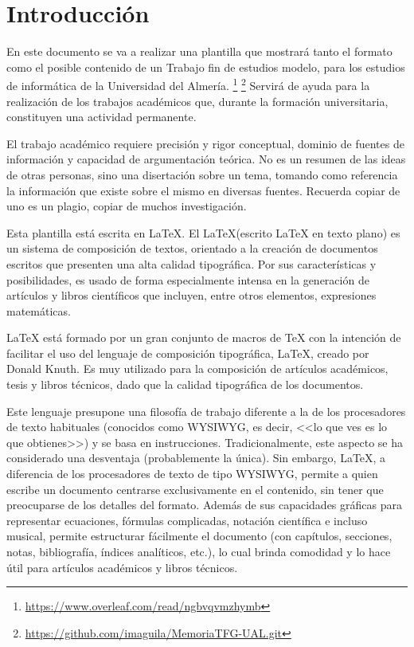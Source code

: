 \chapter {Introducción}
\label{sec:intro}


En este documento se va a realizar una plantilla que mostrará tanto el formato como el posible contenido de un Trabajo fin de estudios modelo, para los estudios de informática de la Universidad del Almería.  \footnote{\url{https://www.overleaf.com/read/ngbvqvmzhymb}} \footnote{\url{https://github.com/imaguila/MemoriaTFG-UAL.git}}
Servirá de  ayuda  para  la  realización  de  los trabajos  académicos  que,  durante  la  formación  universitaria,  constituyen  una  actividad  permanente.

El trabajo académico requiere precisión y rigor conceptual, dominio de fuentes de información y capacidad de argumentación teórica.  No es un  resumen de las ideas de otras personas, sino una disertación sobre un tema, tomando como referencia  la información  que existe sobre el  mismo en diversas fuentes. Recuerda copiar de uno es un plagio, copiar de muchos investigación. \cite{malaga}

Esta  plantilla está escrita en \LaTeX.
El \LaTeX (escrito LaTeX en texto plano) es un sistema de composición de textos, orientado a la creación de documentos escritos que presenten una alta calidad tipográfica. Por sus características y posibilidades, es usado de forma especialmente intensa en la generación de artículos y libros científicos que incluyen, entre otros elementos, expresiones matemáticas. \cite{wiki}

LaTeX está formado por un gran conjunto de macros de TeX con la intención de facilitar el uso del lenguaje de composición tipográfica,  \LaTeX, creado por Donald Knuth. Es muy utilizado para la composición de artículos académicos, tesis y libros técnicos, dado que la calidad tipográfica de los documentos. 

Este lenguaje presupone una filosofía de trabajo diferente a la de los procesadores de texto habituales (conocidos como WYSIWYG, es decir, <<lo que ves es lo que obtienes>>) y se basa en instrucciones. Tradicionalmente, este aspecto se ha considerado una desventaja (probablemente la única). Sin embargo, LaTeX, a diferencia de los procesadores de texto de tipo WYSIWYG, permite a quien escribe un documento centrarse exclusivamente en el contenido, sin tener que preocuparse de los detalles del formato. Además de sus capacidades gráficas para representar ecuaciones, fórmulas complicadas, notación científica e incluso musical, permite estructurar fácilmente el documento (con capítulos, secciones, notas, bibliografía, índices analíticos, etc.), lo cual brinda comodidad y lo hace útil para artículos académicos y libros técnicos.

